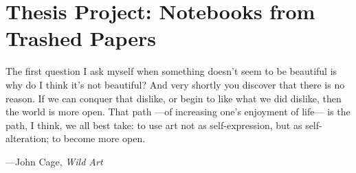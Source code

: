\chapter{Thesis Project: Notebooks from Trashed Papers}


% 
%






\epigraph{The first question I ask myself when something doesn't seem to be beautiful is why do I think it's not beautiful? And very shortly you discover that there is no reason. If we can conquer that dislike, or begin to like what we did dislike, then the world is more open. That path ---of increasing one's enjoyment of life--- is the path, I think, we all best take: to use art not as self-expression, but as self-alteration; to become more open.}{\hfill---John Cage, \textit{Wild Art}}


